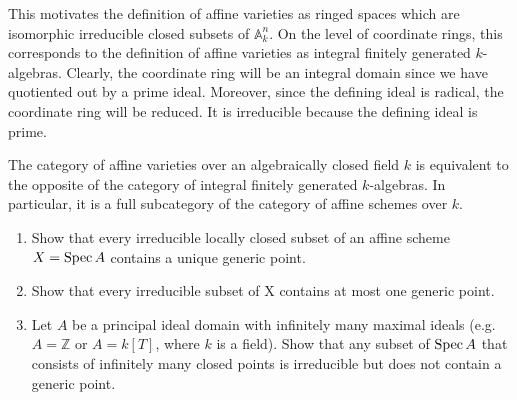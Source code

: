 \documentclass[12pt]{article}
\begin{document}
This motivates the definition of affine varieties as ringed spaces which are isomorphic irreducible closed subsets of $\mathbb A^n_k$. On the level of coordinate rings, this corresponds to the definition of affine varieties as integral finitely generated $k$-algebras. Clearly, the coordinate ring will be an integral domain since we have quotiented out by a prime ideal. Moreover, since the defining ideal is radical, the coordinate ring will be reduced. It is irreducible because the defining ideal is prime.

\begin{theorem}
    The category of affine varieties over an algebraically closed field $k$ is equivalent to the opposite of the category of integral finitely generated $k$-algebras. In particular, it is a full subcategory of the category of affine schemes over $k$.
\end{theorem}

\begin{exercise}\leavevmode
    \begin{enumerate}
        \item Show that every irreducible locally closed subset of an affine scheme $X = \operatorname{Spec} A$ contains a unique generic point.
        \item Show that every irreducible subset of X contains at most one generic point.
        \item Let $A$ be a principal ideal domain with infinitely many maximal ideals (e.g. $A= \mathbb Z$ or $A= k[T]$, where $k$ is a field). Show that any subset of $\operatorname{Spec} A$ that consists of infinitely many closed points is irreducible but does not contain a generic point.
    \end{enumerate}
\end{exercise}
\end{document}
